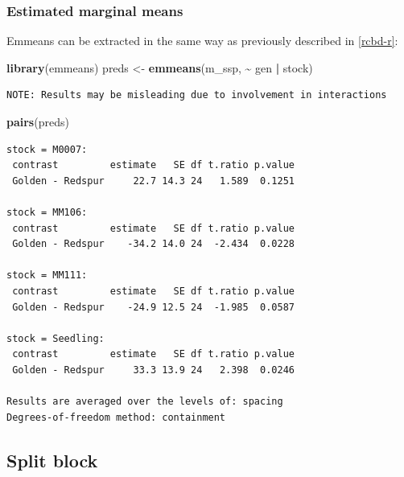\documentclass[
]{book}
\newenvironment{Shaded}{\begin{snugshade}}{\end{snugshade}}
\newcommand{\FunctionTok}[1]{\textcolor[rgb]{0.13,0.29,0.53}{\textbf{#1}}}
\newcommand{\NormalTok}[1]{#1}
\newcommand{\OtherTok}[1]{\textcolor[rgb]{0.56,0.35,0.01}{#1}}
\newcommand{\SpecialCharTok}[1]{\textcolor[rgb]{0.81,0.36,0.00}{\textbf{#1}}}
\begin{document}
\hypertarget{estimated-marginal-means}{%
\subsubsection{Estimated marginal means}\label{estimated-marginal-means}}

Emmeans can be extracted in the same way as previously described in \ref{rcbd-r}:

\begin{Shaded}
\begin{Highlighting}[]
\FunctionTok{library}\NormalTok{(emmeans)}
\NormalTok{preds }\OtherTok{\textless{}{-}} \FunctionTok{emmeans}\NormalTok{(m\_ssp, }\SpecialCharTok{\textasciitilde{}}\NormalTok{ gen }\SpecialCharTok{|}\NormalTok{ stock)}
\end{Highlighting}
\end{Shaded}

\begin{verbatim}
NOTE: Results may be misleading due to involvement in interactions
\end{verbatim}

\begin{Shaded}
\begin{Highlighting}[]
\FunctionTok{pairs}\NormalTok{(preds)}
\end{Highlighting}
\end{Shaded}

\begin{verbatim}
stock = M0007:
 contrast         estimate   SE df t.ratio p.value
 Golden - Redspur     22.7 14.3 24   1.589  0.1251

stock = MM106:
 contrast         estimate   SE df t.ratio p.value
 Golden - Redspur    -34.2 14.0 24  -2.434  0.0228

stock = MM111:
 contrast         estimate   SE df t.ratio p.value
 Golden - Redspur    -24.9 12.5 24  -1.985  0.0587

stock = Seedling:
 contrast         estimate   SE df t.ratio p.value
 Golden - Redspur     33.3 13.9 24   2.398  0.0246

Results are averaged over the levels of: spacing 
Degrees-of-freedom method: containment 
\end{verbatim}

\hypertarget{split-block}{%
\subsection{Split block}\label{split-block}}
\end{document}
